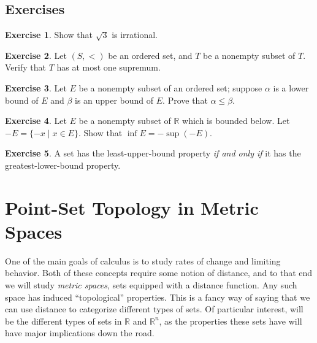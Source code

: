 \documentclass{article}
\newcommand{\R}{\mathbb{R}}
\theoremstyle{definition}
\newtheorem{ex}{Exercise}[section]
\begin{document}
\subsection{Exercises}
\begin{ex}
	Show that $ \sqrt{3} $ is irrational.
\end{ex}
\begin{ex}
	Let $ (S,<) $ be an ordered set, and $ T $ be a nonempty subset of $ T $. Verify that $ T $ has at most one supremum.
\end{ex}
\begin{ex}
	Let $ E $ be a nonempty subset of an ordered set; suppose $ \alpha $ is a lower bound of $ E $ and $ \beta $ is an upper bound of $ E $. Prove that $ \alpha\le\beta $. 
\end{ex}
\begin{ex}
	Let $ E $ be a nonempty subset of $ \R $ which is bounded below. Let $ -E=\{-x\mid x\in E\} $. Show that $ \inf E=-\sup(-E) $. 
\end{ex}
\begin{ex}
	A set has the least-upper-bound property \textit{if and only if} it has the greatest-lower-bound property. 
\end{ex}


\section{Point-Set Topology in Metric Spaces}
One of the main goals of calculus is to study rates of change and limiting behavior. Both of these concepts require some notion of distance, and to that end we will study \textit{metric spaces}, sets equipped with a distance function. Any such space has induced ``topological'' properties. This is a fancy way of saying that we can use distance to categorize different types of sets. Of particular interest, will be the different types of sets in $ \R $ and $ \R^n $, as the properties these sets have will have major implications down the road.  
\end{document}
